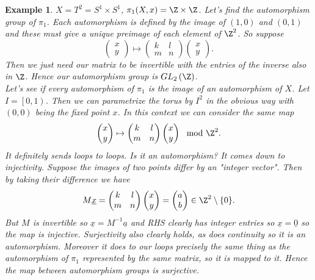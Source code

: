 \documentclass[a4paper]{article}
\newtheorem{exmp}[thm]{Example}
\begin{document}
\begin{exmp} $X=T^{2}=S^{1}\times S^{1}$, $\pi_1(X,x)=\Z\times\Z$. Let's find the automorphism group of $\pi_1$. Each automorphism is defined by the image of $\left( 1,0 \right) $ and $\left( 0,1 \right) $ and these must give a unique preimage of each element of $\Z^{2}$. So suppose \[
    \begin{pmatrix} x\\ y  \end{pmatrix}\mapsto \begin{pmatrix} k & l \\ m & n  \end{pmatrix}\begin{pmatrix} x\\y \end{pmatrix}
.\] 
Then we just need our matrix to be invertible with the entries of the inverse also in $\Z$. Hence our automorphism group is $GL_{2}\left( \Z \right) $.\\
Let's see if every automorphism of $\pi_1$ is the image of an automorphism of $X$. Let $I=\left[ 0,1 \right) $. Then we can parametrize the torus by $I^2$ in the obvious way with $(0,0)$ being the fixed point $x$. In this context we can consider the same map \[
    \begin{pmatrix} x\\ y  \end{pmatrix}\mapsto \begin{pmatrix} k & l \\ m & n  \end{pmatrix}\begin{pmatrix} x\\y \end{pmatrix} \mod\Z^2
.\] It definitely sends loops to loops. Is it an automorphism? It comes down to injectivity. Suppose the images of two points differ by an "integer vector". Then by taking their difference we have \[
M\underline{x}=\begin{pmatrix} k & l\\ m & n \end{pmatrix} \begin{pmatrix} x\\y \end{pmatrix}=\begin{pmatrix} a\\b \end{pmatrix}\in \Z^2\setminus \{0\}
.\] 
But $M$ is invertible so $\underline{x}=M^{-1}\underline{a}$ and RHS clearly has integer entries so $\underline{x}=\underline{0}$ so the map is injective. Surjectivity also clearly holds, as does continuity so it is an automorphism. Moreover it does to our loops precisely the same thing as the automorphism of $\pi_1$ represented by the same matrix, so it is mapped to it. Hence the map between automorphism groups is surjective.

\end{exmp}
\end{document}
